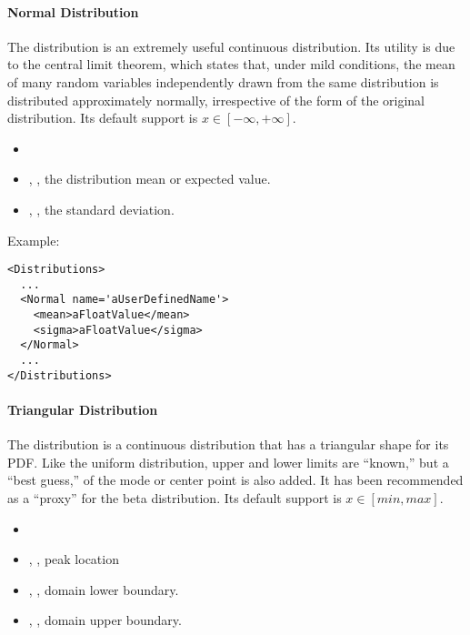 \paragraph{Normal Distribution}
\label{Normal}
The  distribution is an extremely
useful continuous distribution.
%
Its utility is due to the central limit theorem, which states that, under mild
conditions, the mean of many random variables independently drawn from the same
distribution is distributed approximately normally, irrespective of the form of
the original distribution.
%
Its default support is $x \in [-\infty, +\infty]$.

%
\attrIntro
\vspace{-5mm}
\begin{itemize}
  \itemsep0em
  \item \nameDescription
\end{itemize}
\vspace{-5mm}
\subnodesIntro
\begin{itemize}
  \item {}, , the distribution
  mean
  or expected value.
  \item {}, , the standard
  deviation.
\end{itemize}

Example:
\begin{lstlisting}[style=XML]
<Distributions>
  ...
  <Normal name='aUserDefinedName'>
    <mean>aFloatValue</mean>
    <sigma>aFloatValue</sigma>
  </Normal>
  ...
</Distributions>
\end{lstlisting}

\paragraph{Triangular Distribution}
\label{Triangular}
The  distribution is a continuous distribution that has a
triangular shape for its PDF.
%
%
Like the uniform distribution, upper and lower limits are ``known,'' but a
``best guess,'' of the mode or center point is also added.
%
It has been recommended as a ``proxy'' for the beta distribution.
%
Its default support is $x \in [min,max]$.

%
\attrIntro
\vspace{-5mm}
\begin{itemize}
  \itemsep0em
  \item \nameDescription
\end{itemize}
\vspace{-5mm}
\subnodesIntro
\begin{itemize}
  \item {}, , peak location
  \item {}, , domain lower
  boundary.
  \item {}, , domain upper
  boundary.
\end{itemize}

